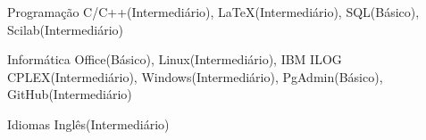 

\begin{cvskills}

  \cvskill
    {Programação} %
    {C/C++(Intermediário), LaTeX(Intermediário), SQL(Básico), Scilab(Intermediário)} %


  \cvskill
    {Informática} %
    {Office(Básico), Linux(Intermediário), IBM ILOG CPLEX(Intermediário), Windows(Intermediário), PgAdmin(Básico), GitHub(Intermediário)} %


  \cvskill
    {Idiomas} %
    {Inglês(Intermediário)} %

\end{cvskills}
